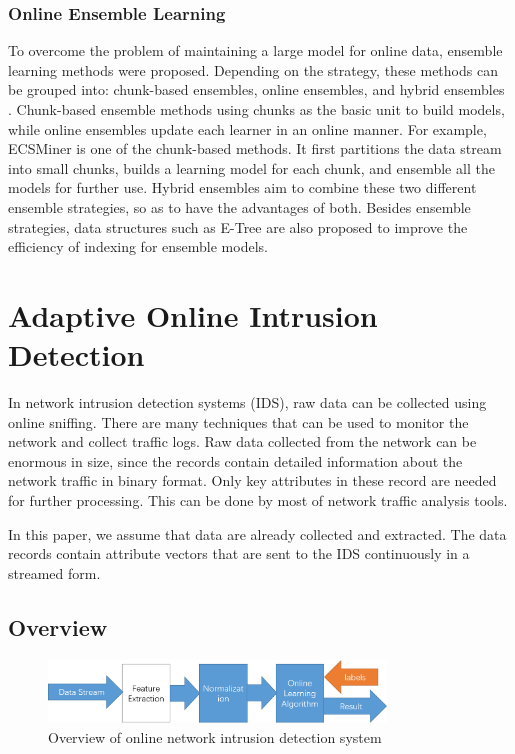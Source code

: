 \documentclass[runningheads]{llncs}
\begin{document}
	\subsubsection{Online Ensemble Learning}
	
	To overcome the problem of maintaining a large model for online data, ensemble learning methods were proposed. Depending on the strategy, these methods can be grouped into: chunk-based ensembles, online ensembles, and hybrid ensembles \cite{Sun2016}. Chunk-based ensemble methods using chunks as the basic unit to build models, while online ensembles update each learner in an online manner. For example, ECSMiner \cite{Masud2011} is one of the chunk-based methods. It first partitions the data stream into small chunks, builds a learning model for each chunk, and ensemble all the models for further use. Hybrid ensembles aim to combine these two different ensemble strategies, so as to have the advantages of both. Besides ensemble strategies, data structures such as E-Tree \cite{Zhang2015} are also proposed to improve the efficiency of indexing for ensemble models. 

	\section{Adaptive Online Intrusion Detection} \label{Our Method}
	
	In network intrusion detection systems (IDS), raw data can be collected using online sniffing. There are many techniques that can be used to monitor the network and collect traffic logs. Raw data collected from the network can be enormous in size, since the records contain detailed information about the network traffic in binary format. Only key attributes in these record are needed for further processing. This can be done by most of network traffic analysis tools.

	In this paper, we assume that data are already collected and extracted. The data records contain attribute vectors that are sent to the IDS continuously in a streamed form.

	\subsection{Overview}
	
	\begin{figure}
		\centering
		\includegraphics[width=0.8\textwidth]{overview}
		\caption{Overview of online network intrusion detection system}
		\label{fig:overview}
	\end{figure}
	
\end{document}
